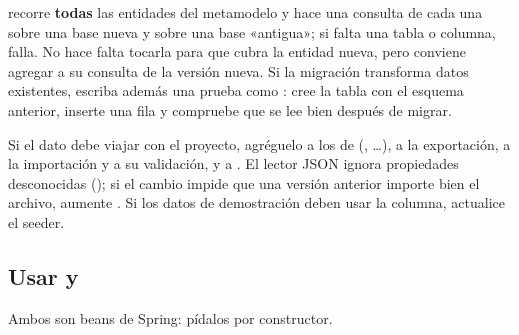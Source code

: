  recorre \textbf{todas} las entidades del metamodelo y hace una consulta de cada una sobre
una base nueva y sobre una base «antigua»; si falta una tabla o columna, falla. No hace falta tocarla para que cubra la
entidad nueva, pero conviene agregar a su consulta de  la versión nueva. Si la migración
transforma datos existentes, escriba además una prueba como : cree la tabla con el
esquema anterior, inserte una fila y compruebe que se lee bien después de migrar.

\par\medskip\noindent{}\hspace{0.5em}{\bfseries Revisar el intercambio y los seeders}\par\nopagebreak\smallskip

Si el dato debe viajar con el proyecto, agréguelo a los  de 
(, \ldots), a la exportación, a la importación y a su validación, y a
. El lector JSON ignora propiedades desconocidas
(); si el cambio impide que una versión anterior importe bien el archivo,
aumente . Si los datos de demostración deben usar la columna, actualice el seeder.

\subsection{Usar  y }
\label{sec:amp-notificador}

Ambos son beans de Spring: pídalos por constructor.

